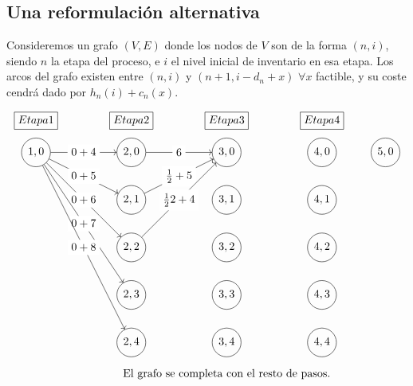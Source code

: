 \documentclass[MIOP.tex]{subfiles}
\begin{document}
\subsection{Una reformulación alternativa}
Consideremos un grafo $(V,E)$ donde los nodos de $V$ son de la forma $(n,i)$, siendo $n$ la etapa del proceso, e $i$ el nivel inicial de inventario en esa etapa. Los arcos del grafo existen entre $(n,i)$ y $(n+1,i-d_n+x)$ $\forall x$ factible, y su coste cendrá dado por $h_n(i)+c_n(x)$. 

\[
\begin{tikzpicture}
 	\node[shape=rectangle,draw=black] (Z) at (-4,4) {$Etapa 1$};
 	\node[shape=rectangle,draw=black] (Y) at (-1,4) {$Etapa 2$};
 	\node[shape=rectangle,draw=black] (X) at (2,4) {$Etapa 3$};
 	\node[shape=rectangle,draw=black] (W) at (5,4) {$Etapa 4$};
 	
    \node[shape=circle,draw=black] (A) at (-4,3) {$1,0$};
    \node[shape=circle,draw=black] (B) at (-1,3) {$2,0$};
    \node[shape=circle,draw=black] (C) at (2,3) {$3,0$};
    \node[shape=circle,draw=black] (D) at (5,3) {$4,0$};  
      
    \node[shape=circle,draw=black] (E) at (7,3) {$5,0$}; 
    
    \node[shape=circle,draw=black] (B1) at (-1,1.5) {$2,1$};
    \node[shape=circle,draw=black] (C1) at (2,1.5) {$3,1$};
    \node[shape=circle,draw=black] (D1) at (5,1.5) {$4,1$};
    
    \node[shape=circle,draw=black] (B2) at (-1,0) {$2,2$};
    \node[shape=circle,draw=black] (C2) at (2,0) {$3,2$};
    \node[shape=circle,draw=black] (D2) at (5,0) {$4,2$};
    
    \node[shape=circle,draw=black] (B3) at (-1,-1.5) {$2,3$};
    \node[shape=circle,draw=black] (C3) at (2,-1.5) {$3,3$};
    \node[shape=circle,draw=black] (D3) at (5,-1.5) {$4,3$};
    
    \node[shape=circle,draw=black] (B4) at (-1,-3) {$2,4$};
    \node[shape=circle,draw=black] (C4) at (2,-3) {$3,4$};
    \node[shape=circle,draw=black] (D4) at (5,-3) {$4,4$};
    
    \node[draw=none, fill=none] (NOTA) at (2,-4) {$\text{El grafo se completa con el resto de pasos.}$};

\tikzset{every node/.style={fill=white}} 
     \path [->] (A) edge node {$0+4$} (B);
     \path [->] (A) edge node {$0+5$} (B1);
     \path [->] (A) edge node {$0+6$} (B2);
     \path [->] (A) edge node {$0+7$} (B3);
     \path [->] (A) edge node {$0+8$} (B4);
     \path [->] (B) edge node {$6$} (C);
     \path [->] (B1) edge node {$\frac{1}{2}+5$} (C);
     \path [->] (B2) edge node {$\frac{1}{2}2+4$} (C);

\end{tikzpicture}
\]
\end{document}
